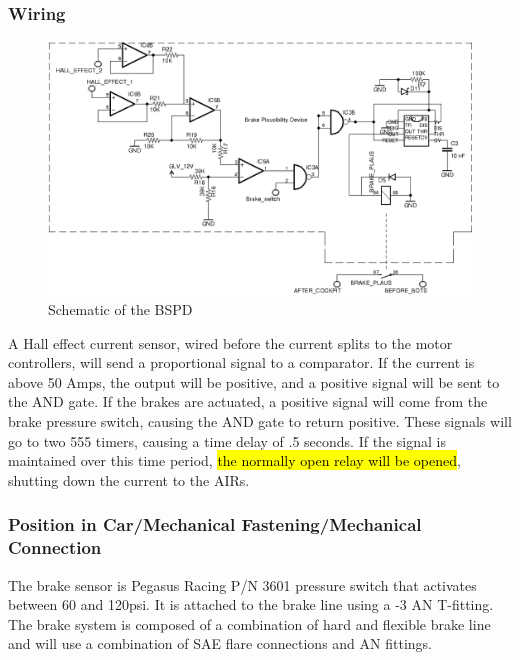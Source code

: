 \documentclass{article}
\DeclareRobustCommand{\hlr}[1]{{\sethlcolor{red}\hl{#1}}}
\begin{document}
        \subsubsection{Wiring}

            \begin{figure}[H]
                \centering
                \includegraphics[width = 0.9 \textwidth]{BSPD}
                \caption{Schematic of the BSPD}
                \label{BSPDschem}
            \end{figure}

A Hall effect current sensor, wired before the current splits to the motor controllers, will send a proportional signal to a comparator. If the current is above 50 Amps, the output will be positive, and a positive signal will be sent to the AND gate. If the brakes are actuated, a positive signal will come from the brake pressure switch, causing the AND gate to return positive. These signals will go to two 555 timers, causing a time delay of .5 seconds. If the signal is maintained over this time period, \hlr{the normally open relay will be opened}, shutting down the current to the AIRs.


        \subsubsection{Position in Car/Mechanical Fastening/Mechanical Connection}
 The brake sensor is Pegasus Racing P/N 3601 pressure switch that activates between 60 and 120psi. It is attached to the brake line using a -3 AN T-fitting. The brake system is composed of a combination of hard and flexible brake line and will use a combination of SAE flare connections and AN fittings.
\end{document}
